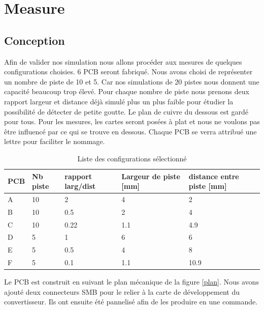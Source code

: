 \graphicspath{ {./figuresMeasure} }
\section{Measure}

\subsection{Conception}
Afin de valider nos simulation nous allons procéder aux mesures de quelques configurations choisies. 6 PCB seront fabriqué. Nous avons choisi de représenter un nombre de piste de 10 et 5. Car nos simulations de 20 pistes nous donnent une capacité beaucoup trop élevé. Pour chaque nombre de piste nous prenons deux rapport largeur et distance déjà simulé plus un plus faible pour étudier la possibilité de détecter de petite goutte. Le plan de cuivre du dessous est gardé pour tous. Pour les mesures, les cartes seront posées à plat et nous ne voulons pas être influencé par ce qui se trouve en dessous. Chaque PCB se verra attribué une lettre pour faciliter le nommage.

\begin{table}[!ht]
\begin{center}
\begin{tabular}[c]{lllll}
PCB & Nb piste & rapport larg/dist & Largeur de piste [mm] & distance entre piste [mm] \\
\hline
A & 10 & 2 & 4 & 2\\
B & 10 & 0.5 & 2 & 4\\
C & 10 & 0.22 & 1.1 & 4.9\\
D & 5 & 1 & 6 & 6\\
E & 5 & 0.5 & 4 & 8\\
F & 5 & 0.1 & 1.1 & 10.9
\end{tabular}
\caption{Liste des configurations sélectionné }
\end{center}
\end{table}

Le PCB est construit en suivant le plan mécanique de la figure \ref{plan}. Nous avons ajouté deux connecteurs SMB pour le relier à la carte de développement du convertisseur. Ils ont ensuite été pannelisé afin de les produire en une commande.

